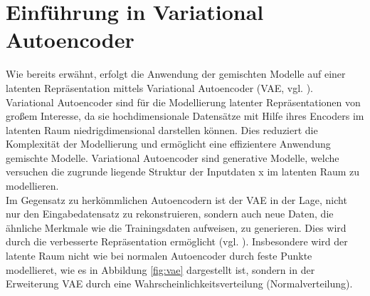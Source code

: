 \documentclass[%
thesis=student,%
coverpage=false,%
titlepage=false,%
headmarks=true, %
german,%
font=libertine, %
math=newpxtx, %
BCOR=5mm,%
coverBCOR=11mm%
]{tumbook}
\theoremstyle{break}
\begin{document}

\section{Einführung in Variational Autoencoder}
Wie bereits erwähnt, erfolgt die Anwendung der gemischten Modelle auf einer latenten Repräsentation mittels Variational Autoencoder (VAE, vgl. \cite{Auto-EncodingVariationalBayes}).
Variational Autoencoder sind für die Modellierung latenter Repräsentationen von großem Interesse, da sie hochdimensionale Datensätze mit Hilfe ihres Encoders im latenten Raum  niedrigdimensional darstellen können. Dies reduziert die Komplexität der Modellierung und ermöglicht eine effizientere Anwendung gemischte Modelle. Variational Autoencoder sind generative Modelle, welche versuchen die zugrunde liegende Struktur der Inputdaten x im latenten Raum zu modellieren.\\
Im Gegensatz zu herkömmlichen Autoencodern ist der VAE in der Lage, nicht nur den Eingabedatensatz zu rekonstruieren, sondern auch neue Daten, die ähnliche Merkmale wie die Trainingsdaten aufweisen, zu generieren. Dies wird durch die verbesserte Repräsentation ermöglicht (vgl. \cite{bigdata-insider-vae}). Insbesondere wird der latente Raum nicht wie bei normalen Autoencoder durch feste Punkte modellieret, wie es in Abbildung \ref{fig:vae} dargestellt ist, sondern in der Erweiterung VAE durch eine Wahrscheinlichkeitsverteilung (Normalverteilung).
\end{document}
